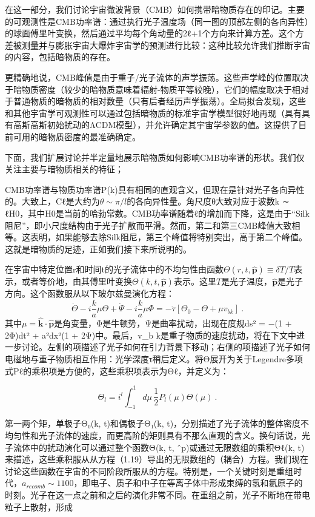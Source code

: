 


在这一部分，我们讨论宇宙微波背景（CMB）如何携带暗物质存在的印记。主要的可观测性是CMB功率谱：通过执行光子温度场（同一图的顶部左侧的各向异性）的球面傅里叶变换，然后通过平均每个角动量的2ℓ+1个方向来计算方差。这个方差被测量并与膨胀宇宙大爆炸宇宙学的预测进行比较：这种比较允许我们推断宇宙的内容，包括暗物质的存在。

更精确地说，CMB峰值是由于重子/光子流体的声学振荡。这些声学峰的位置取决于暗物质密度（较少的暗物质意味着辐射-物质平等较晚），它们的幅度取决于相对于普通物质的暗物质的相对数量（只有后者经历声学振荡）。全局拟合发现，这些和其他宇宙学可观测性可以通过包括暗物质的标准宇宙学模型很好地再现（具有具有高斯高斯初始扰动的ΛCDM模型），并允许确定其宇宙学参数的值。这提供了目前可用的暗物质密度的最准确确定。

下面，我们扩展讨论并半定量地展示暗物质如何影响CMB功率谱的形状。我们仅关注主要与暗物质相关的特征； 

CMB功率谱与物质功率谱P(k)具有相同的直观含义，但现在是针对光子各向异性的。大致上，Cℓ是大约为$\theta \sim \pi /l$的各向异性量。角尺度θ大致对应于波数k ∼ ℓH0，其中H0是当前的哈勃常数。CMB功率谱随着ℓ的增加而下降，这是由于“Silk阻尼”，即小尺度结构由于光子扩散而平滑。然而，第二和第三CMB峰值大致相等。这表明，如果能够去除Silk阻尼，第三个峰值将特别突出，高于第二个峰值。这就是暗物质的足迹，正如我们接下来所说明的。

在宇宙中特定位置r和时间t的光子流体中的不均匀性由函数$\Theta(r, t, \hat{\mathbf{p}}) \equiv \delta T/T$表示，或者等价地，由其傅里叶变换$\Theta(k, t, \hat{\mathbf{p}})$表示。这里$T$是光子温度，$\hat{\mathbf{p}}$是光子方向。这个函数服从以下玻尔兹曼演化方程：
\[ \dot{\Theta} - i \frac{k}{a}\mu  \Theta + \dot{\Psi} - i \frac{k}{a} \mu  \Phi = - \dot{\tau}[\Theta_0 - \Theta + \mu v_{b k}]~. \]
其中$\mu = \hat{\mathbf{k}} \cdot \hat{\mathbf{p}}$是角变量，Φ是牛顿势，Ψ是曲率扰动，出现在度规ds² = −(1 + 2Φ)dt² + a²dx²(1 + 2Ψ)中。最后，v_b k是重子物质的速度扰动，将在下文中进一步讨论。左侧的项描述了光子如何在引力背景下移动；右侧的项描述了光子如何电磁地与重子物质相互作用：光学深度τ稍后定义。将Θ展开为关于Legendre多项式Pℓ的乘积项是方便的，这些乘积项表示为Θℓ，并定义为：

\[ \Theta_l = i^l\int_{-1}^{1} d\mu \, \frac{1}{2} P_l(\mu) \Theta(\mu)~. \]

第一两个矩，单极子Θ₀(k, t)和偶极子Θ₁(k, t)，分别描述了光子流体的整体密度不均匀性和光子流体的速度，而更高阶的矩则具有不那么直观的含义。换句话说，光子流体中的扰动演化可以通过整个函数Θ(k, t, ˆp)或通过无限数组的乘积Θℓ(k, t)来描述，这些乘积服从从方程（1.19）导出的无限数组的（耦合）方程。我们现在讨论这些函数在宇宙的不同阶段所服从的方程。特别是，一个关键时刻是重组时代，$a_{recomb} \sim 1100$，即电子、质子和中子在等离子体中形成束缚的氢和氦原子的时刻。光子在这一点之前和之后的演化非常不同。在重组之前，光子不断地在带电粒子上散射，形成


